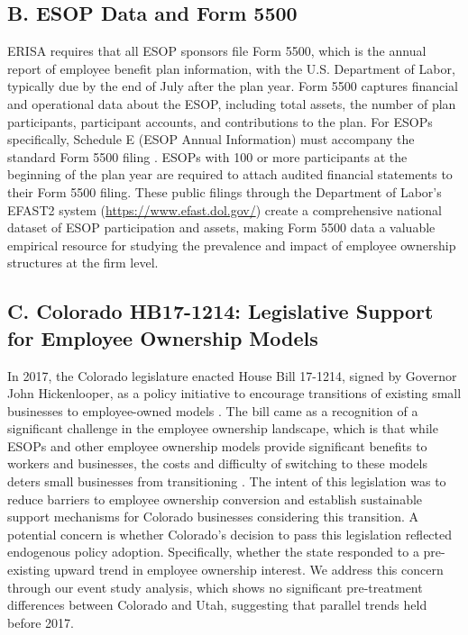 \documentclass[12pt]{article}
\begin{document}
\subsection*{B. ESOP Data and Form 5500}

ERISA requires that all ESOP sponsors file Form 5500, which is the annual report of employee benefit plan information, with the U.S. Department of Labor, typically due by the end of July after the plan year. Form 5500 captures financial and operational data about the ESOP, including total assets, the number of plan participants, participant accounts, and contributions to the plan. For ESOPs specifically, Schedule E (ESOP Annual Information) must accompany the standard Form 5500 filing \citep{DOLForm5500ScheduleE}. ESOPs with 100 or more participants at the beginning of the plan year are required to attach audited financial statements to their Form 5500 filing. These public filings through the Department of Labor's EFAST2 system (\url{https://www.efast.dol.gov/}) create a comprehensive national dataset of ESOP participation and assets, making Form 5500 data a valuable empirical resource for studying the prevalence and impact of employee ownership structures at the firm level.

\subsection*{C. Colorado HB17-1214: Legislative Support for Employee Ownership Models}

In 2017, the Colorado legislature enacted House Bill 17-1214, signed by Governor John Hickenlooper, as a policy initiative to encourage transitions of existing small businesses to employee-owned models \citep{ColoradoHB17-1214}. The bill came as a recognition of a significant challenge in the employee ownership landscape, which is that while ESOPs and other employee ownership models provide significant benefits to workers and businesses, the costs and difficulty of switching to these models deters small businesses from transitioning \citep{OBoyle2016}. The intent of this legislation was to reduce barriers to employee ownership conversion and establish sustainable support mechanisms for Colorado businesses considering this transition. A potential concern is whether Colorado's decision to pass this legislation reflected endogenous policy adoption. Specifically, whether the state responded to a pre-existing upward trend in employee ownership interest. We address this concern through our event study analysis, which shows no significant pre-treatment differences between Colorado and Utah, suggesting that parallel trends held before 2017.
\end{document}
